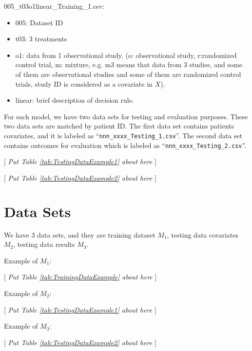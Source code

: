\documentclass[12pt]{article}
\begin{document}
005\_t03o1linear\_Training\_1.csv:
\begin{itemize}
	\item 005: Dataset ID
	\item t03: 3 treatments
	\item o1: data from 1 observational study. (o: observational study, r:randomized control trial, m: mixture, e.g. m3 means that data from 3 studies, and some of them are observational studies and some of them are randomized control trials, study ID is considered as a covariate in $X$).
	\item linear: brief description of decision rule.
\end{itemize}







For each model, we have two data sets for testing and evaluation purposes. These two data sets are matched by patient ID.
The first data set contains patients covariates, and it is labeled as ``\verb"nnn_xxxx_Testing_1.csv"''. The second data set contains outcomes for evaluation which is labeled as ``\verb"nnn_xxxx_Testing_2.csv"''.

\begin{center}
	{[ \textsl{Put Table \ref{tab:TestingDataExample1} about here} ]}
\end{center}

\begin{center}
	{[ \textsl{Put Table \ref{tab:TestingDataExample2} about here} ]}
\end{center}


\section{Data Sets} \label{sec.DataSetsExplained}
We have 3 data sets, and they are training dataset $M_1$, testing data covariates $M_2$, testing data results $M_3$.

Example of $M_1$:
\begin{center}
{[ \textsl{Put Table \ref{tab:TrainingDataExample} about here} ]}
\end{center}

Example of $M_2$:
\begin{center}
{[ \textsl{Put Table \ref{tab:TestingDataExample1} about here} ]}
\end{center}

Example of $M_3$:
\begin{center}
{[ \textsl{Put Table \ref{tab:TestingDataExample2} about here} ]}
\end{center}
\end{document}
